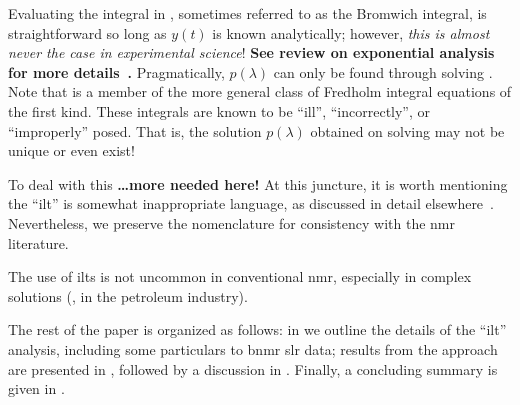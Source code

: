 Evaluating the integral in , sometimes referred to as the Bromwich integral, is straightforward so long as $y(t)$ is known analytically;
however, \emph{this is almost never the case in experimental science}!
\textbf{See review on exponential analysis for more details~\cite{1999-Istratov-RSI-70-1233}.}
Pragmatically, $p ( \lambda )$ can only be found through solving .
Note that  is a member of the more general class of Fredholm integral equations of the first kind.
These integrals are known to be ``ill'', ``incorrectly'', or ``improperly'' posed.
That is, the solution $p ( \lambda )$ obtained on solving  may not be unique or even exist!

To deal with this \textbf{\dots more needed here!}
At this juncture, it is worth mentioning the ``\gls{ilt}'' is somewhat inappropriate language, as discussed in detail elsewhere~\cite{2017-Fordham-DF-29-2}.
Nevertheless, we preserve the nomenclature for consistency with the \gls{nmr} literature.



The use of \glspl{ilt} is not uncommon in conventional \gls{nmr}, especially in complex solutions (, in the petroleum industry).




The rest of the paper is organized as follows:
in  we outline the details of the ``\gls{ilt}'' analysis, including some particulars to \gls{bnmr} \gls{slr} data;
results from the approach are presented in ,
followed by a discussion in .
Finally, a concluding summary is given in .
